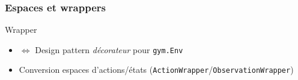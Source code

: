 \documentclass{beamer}
\begin{document}
\begin{frame}
    \frametitle{Espaces et wrappers}
    \fontsize{9pt}{7}\selectfont
    \begin{block}{Wrapper}
        \begin{itemize}
            \item $\Leftrightarrow$ Design pattern \textit{décorateur} pour \texttt{gym.Env}
            \item Conversion espaces d'actions/états (\texttt{ActionWrapper}/\texttt{ObservationWrapper})
        \end{itemize}
    \end{block}
\end{frame}
\end{document}
